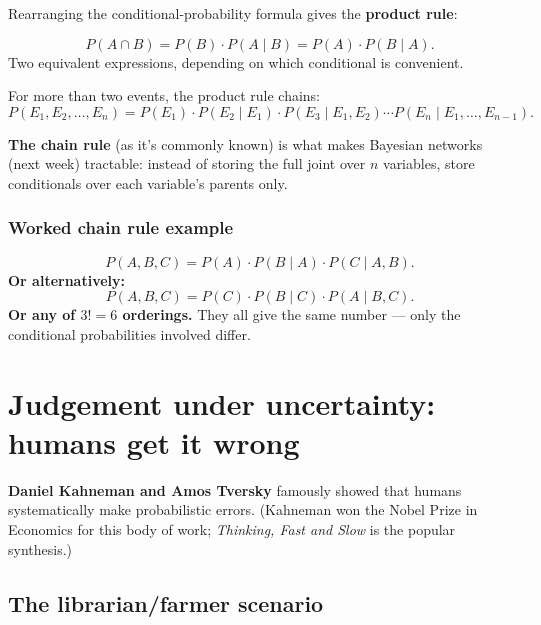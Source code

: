 \documentclass[11pt, a4paper]{article}
\begin{document}
Rearranging the conditional-probability formula gives the \textbf{product rule}:

\begin{defbox}
\[
P(A \cap B) = P(B) \cdot P(A \mid B) = P(A) \cdot P(B \mid A).
\]
Two equivalent expressions, depending on which conditional is convenient.
\end{defbox}

For more than two events, the product rule chains:
\[
P(E_1, E_2, \dots, E_n) = P(E_1) \cdot P(E_2 \mid E_1) \cdot P(E_3 \mid E_1, E_2) \cdots P(E_n \mid E_1, \dots, E_{n-1}).
\]

\textbf{The chain rule} (as it's commonly known) is what makes Bayesian networks (next week) tractable: instead of storing the full joint over $n$ variables, store conditionals over each variable's parents only.

\subsubsection*{Worked chain rule example}

\begin{exbox}
\[
P(A, B, C) = P(A) \cdot P(B \mid A) \cdot P(C \mid A, B).
\]
\textbf{Or alternatively:}
\[
P(A, B, C) = P(C) \cdot P(B \mid C) \cdot P(A \mid B, C).
\]
\textbf{Or any of $3! = 6$ orderings.} They all give the same number — only the conditional probabilities involved differ.
\end{exbox}

\section{Judgement under uncertainty: humans get it wrong}

\textbf{Daniel Kahneman and Amos Tversky} famously showed that humans systematically make probabilistic errors. (Kahneman won the Nobel Prize in Economics for this body of work; \emph{Thinking, Fast and Slow} is the popular synthesis.)

\subsection{The librarian/farmer scenario}
\end{document}
